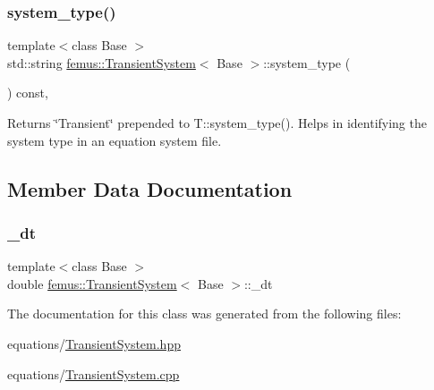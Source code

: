 \subsubsection{\texorpdfstring{system\+\_\+type()}{system\_type()}}
{\footnotesize\ttfamily template$<$class Base $>$ \\
std\+::string \mbox{\hyperlink{classfemus_1_1_transient_system}{femus\+::\+Transient\+System}}$<$ Base $>$\+::system\+\_\+type (\begin{DoxyParamCaption}{ }\end{DoxyParamCaption}) const\hspace{0.3cm}{\ttfamily [inline]}, {\ttfamily [virtual]}}

\begin{DoxyReturn}{Returns}
{\ttfamily \char`\"{}\+Transient\char`\"{}} prepended to T\+::system\+\_\+type(). Helps in identifying the system type in an equation system file. 
\end{DoxyReturn}


\subsection{Member Data Documentation}
\mbox{\label{classfemus_1_1_transient_system_aefd0fbc7c28cbcf0a8cf72707841c661}} 
\subsubsection{\texorpdfstring{\+\_\+dt}{\_dt}}
{\footnotesize\ttfamily template$<$class Base $>$ \\
double \mbox{\hyperlink{classfemus_1_1_transient_system}{femus\+::\+Transient\+System}}$<$ Base $>$\+::\+\_\+dt\hspace{0.3cm}{\ttfamily [protected]}}



The documentation for this class was generated from the following files\+:\begin{DoxyCompactItemize}
\item 
equations/\mbox{\hyperlink{_transient_system_8hpp}{Transient\+System.\+hpp}}\item 
equations/\mbox{\hyperlink{_transient_system_8cpp}{Transient\+System.\+cpp}}\end{DoxyCompactItemize}
